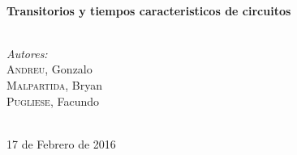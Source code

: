 \begin{titlepage}
\HRule \\[0.4cm]
{ \huge \bfseries Transitorios y tiempos caracteristicos de circuitos}\\[0.2cm] %
\HRule \\[1cm]
 

\begin{minipage}{0.4\textwidth}
\begin{center} \large
\emph{Autores:}\\
\textsc{Andreu}, Gonzalo\\ %
\textsc{Malpartida}, Bryan\\ %
\textsc{Pugliese}, Facundo\\ %


\end{center}
\end{minipage}
~ \\[1.25cm]





{\large 17 de Febrero de 2016}\\[1.75cm] %



\end{titlepage}
